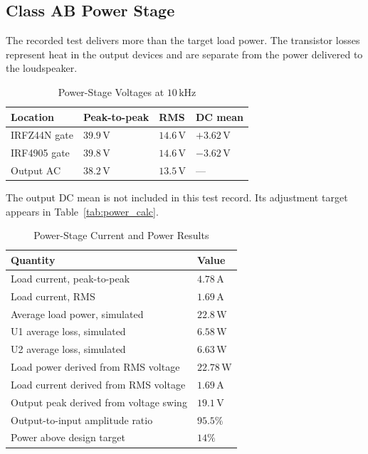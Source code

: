 \documentclass[conference,letterpaper]{IEEEtran}
\newcommand{\V}{\mathrm{V}}
\newcommand{\A}{\mathrm{A}}
\newcommand{\W}{\mathrm{W}}
\newcommand{\kHz}{\mathrm{kHz}}
\begin{document}
\subsection{Class AB Power Stage}
The recorded test delivers more than the target load power.
The transistor losses represent heat in the output devices and are
separate from the power delivered to the loudspeaker.
\begin{table}[H]
\caption{Power-Stage Voltages at $10\,\kHz$}
\label{tab:voltages}
\centering\footnotesize
\setlength{\tabcolsep}{2pt}
\begin{tabular}{@{}p{}p{}p{}p{}@{}}
\toprule
Location & Peak-to-peak & RMS & DC mean\\
\midrule
IRFZ44N gate & $39.9\,\V$ & $14.6\,\V$ & $+3.62\,\V$\\
IRF4905 gate & $39.8\,\V$ & $14.6\,\V$ & $-3.62\,\V$\\
Output AC & $38.2\,\V$ & $13.5\,\V$ & ---\\
\bottomrule
\end{tabular}
\par\smallskip
\parbox{.97\columnwidth}{\scriptsize The output DC mean is not included in this test record. Its adjustment target appears in Table~\ref{tab:power_calc}.}
\end{table}
\FloatBarrier
\begin{table}[H]
\caption{Power-Stage Current and Power Results}
\label{tab:powers}
\centering\footnotesize
\setlength{\tabcolsep}{2pt}
\begin{tabular}{@{}p{}p{}@{}}
\toprule
Quantity & Value\\
\midrule
Load current, peak-to-peak & $4.78\,\A$\\
Load current, RMS & $1.69\,\A$\\
Average load power, simulated & $22.8\,\W$\\
U1 average loss, simulated & $6.58\,\W$\\
U2 average loss, simulated & $6.63\,\W$\\
Load power derived from RMS voltage & $22.78\,\W$\\
Load current derived from RMS voltage & $1.69\,\A$\\
Output peak derived from voltage swing & $19.1\,\V$\\
Output-to-input amplitude ratio & $95.5\%$\\
Power above design target & $14\%$\\
\bottomrule
\end{tabular}
\end{table}
\FloatBarrier
\end{document}
